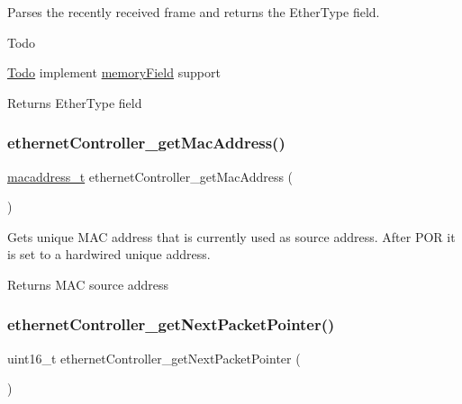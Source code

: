Parses the recently received frame and returns the Ether\+Type field. 

\begin{DoxyRefDesc}{Todo}
\item[\mbox{\hyperlink{todo__todo000012}{Todo}}]implement \mbox{\hyperlink{structmemory_field}{memory\+Field}} support \end{DoxyRefDesc}
\begin{DoxyReturn}{Returns}
Ether\+Type field 
\end{DoxyReturn}
\mbox{\label{group__data__reception_gae3335ee23b52ab5086b95f83127b755c}} 
\subsubsection{\texorpdfstring{ethernetController\_getMacAddress()}{ethernetController\_getMacAddress()}}
{\footnotesize\ttfamily \mbox{\hyperlink{group__ethernet_gacb865bcbf50a6c8cef05581bfabff373}{macaddress\+\_\+t}} ethernet\+Controller\+\_\+get\+Mac\+Address (\begin{DoxyParamCaption}{ }\end{DoxyParamCaption})}



Gets unique M\+AC address that is currently used as source address. After P\+OR it is set to a hardwired unique address. 

\begin{DoxyReturn}{Returns}
M\+AC source address 
\end{DoxyReturn}
\mbox{\label{group__data__reception_ga6155805a8511681932051b00a0032f9f}} 
\subsubsection{\texorpdfstring{ethernetController\_getNextPacketPointer()}{ethernetController\_getNextPacketPointer()}}
{\footnotesize\ttfamily uint16\+\_\+t ethernet\+Controller\+\_\+get\+Next\+Packet\+Pointer (\begin{DoxyParamCaption}{ }\end{DoxyParamCaption})}



